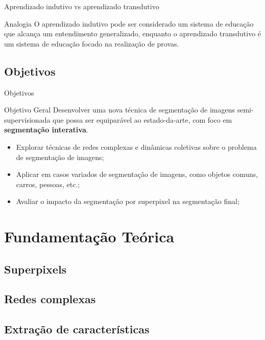 \documentclass{templatebeamerufc/libs/ufc_format}
\begin{document}
\begin{frame}{Aprendizado indutivo vs aprendizado transdutivo}
  \begin{exampleblock}{Analogia}
    O aprendizado indutivo pode ser considerado um sistema de educação que
alcança um entendimento generalizado, enquanto o aprendizado
transdutivo é um sistema de educação focado na realização de provas.
  \end{exampleblock}
\end{frame}

\subsection{Objetivos}
\begin{frame}{Objetivos}
  \begin{alertblock}{Objetivo Geral}
    Desenvolver uma nova técnica de segmentação de imagens
    semi-supervisionada que possa ser equiparável ao estado-da-arte, com
    foco em \textbf{segmentação interativa}.
  \end{alertblock}
  \pause{}
  \begin{itemize}[<+->]
  \item Explorar técnicas de redes complexas e dinâmicas coletivas sobre
    o problema de segmentação de imagens;
  \item Aplicar em casos variados de segmentação de imagens, como
    objetos comuns, carros, pessoas, etc.;
  \item Avaliar o impacto da segmentação por superpixel na segmentação final;
  \end{itemize}

\end{frame}


\section{Fundamentação Teórica}
\subsection{Superpixels}
\subsection{Redes complexas}
\subsection{Extração de características}
\end{document}
